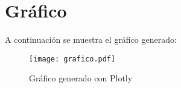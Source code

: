 \documentclass{article}
\begin{document}
\section{Gráfico}

A continuación se muestra el gráfico generado:

\begin{figure}[h]
    \centering
    \texttt{[image: grafico.pdf]}
    \caption{Gráfico generado con Plotly}
    \label{fig:grafico}
\end{figure}
\end{document}

